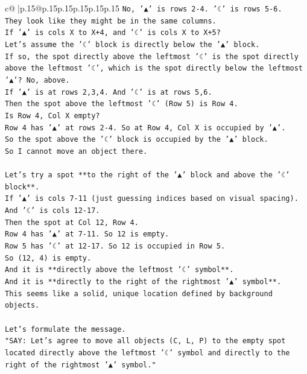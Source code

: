 \documentclass{article}
\begin{document}
{\begin{supertabular}{c@{$\;$}|p{.15\linewidth}@{}p{.15\linewidth}p{.15\linewidth}p{.15\linewidth}p{.15\linewidth}p{.15\linewidth}}
{{{\texttt{No, '▲' is rows 2{-}4. '☾' is rows 5{-}6.} \\
\texttt{They look like they might be in the same columns.} \\
\texttt{If '▲' is cols X to X+4, and '☾' is cols X to X+5?} \\
\texttt{Let's assume the '☾' block is directly below the '▲' block.} \\
\texttt{If so, the spot directly above the leftmost '☾' is the spot directly above the leftmost '☾', which is the spot directly below the leftmost '▲'? No, above.} \\
\texttt{If '▲' is at rows 2,3,4. And '☾' is at rows 5,6.} \\
\texttt{Then the spot above the leftmost '☾' (Row 5) is Row 4.} \\
\texttt{Is Row 4, Col X empty?} \\
\texttt{Row 4 has '▲' at rows 2{-}4. So at Row 4, Col X is occupied by '▲'.} \\
\texttt{So the spot above the '☾' block is occupied by the '▲' block.} \\
\texttt{So I cannot move an object there.} \\
\\ 
\texttt{Let's try a spot **to the right of the '▲' block and above the '☾' block**.} \\
\texttt{If '▲' is cols 7{-}11 (just guessing indices based on visual spacing).} \\
\texttt{And '☾' is cols 12{-}17.} \\
\texttt{Then the spot at Col 12, Row 4.} \\
\texttt{Row 4 has '▲' at 7{-}11. So 12 is empty.} \\
\texttt{Row 5 has '☾' at 12{-}17. So 12 is occupied in Row 5.} \\
\texttt{So (12, 4) is empty.} \\
\texttt{And it is **directly above the leftmost '☾' symbol**.} \\
\texttt{And it is **directly to the right of the rightmost '▲' symbol**.} \\
\texttt{This seems like a solid, unique location defined by background objects.} \\
\\ 
\texttt{Let's formulate the message.} \\
\texttt{"SAY: Let's agree to move all objects (C, L, P) to the empty spot located directly above the leftmost '☾' symbol and directly to the right of the rightmost '▲' symbol."} \\
}}}
\end{supertabular}}
\end{document}
